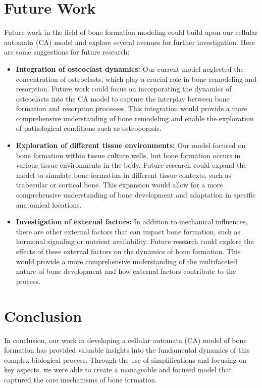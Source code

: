\documentclass[conference]{IEEEtran}
\begin{document}
\section{Future Work}
Future work in the field of bone formation modeling could build upon our cellular automata (CA) model and explore several avenues for further investigation. Here are some suggestions for future research:
\begin{itemize}
    \item \textbf{Integration of osteoclast dynamics:} Our current model neglected the concentration of osteoclasts, which play a crucial role in bone remodeling and resorption. Future work could focus on incorporating the dynamics of osteoclasts into the CA model to capture the interplay between bone formation and resorption processes. This integration would provide a more comprehensive understanding of bone remodeling and enable the exploration of pathological conditions such as osteoporosis.
    \item \textbf{Exploration of different tissue environments:} Our model focused on bone formation within tissue culture wells, but bone formation occurs in various tissue environments in the body. Future research could expand the model to simulate bone formation in different tissue contexts, such as trabecular or cortical bone. This expansion would allow for a more comprehensive understanding of bone development and adaptation in specific anatomical locations.
    \item \textbf{Investigation of external factors:} In addition to mechanical influences, there are other external factors that can impact bone formation, such as hormonal signaling or nutrient availability. Future research could explore the effects of these external factors on the dynamics of bone formation. This would provide a more comprehensive understanding of the multifaceted nature of bone development and how external factors contribute to the process.
\end{itemize}
\section{Conclusion}
In conclusion, our work in developing a cellular automata (CA) model of bone formation has provided valuable insights into the fundamental dynamics of this complex biological process. Through the use of simplifications and focusing on key aspects, we were able to create a manageable and focused model that captured the core mechanisms of bone formation.
\end{document}
